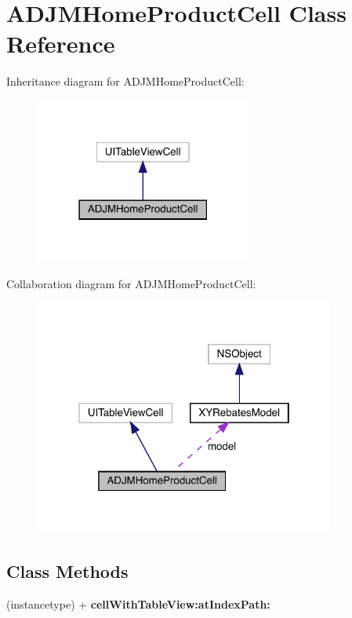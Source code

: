 \hypertarget{interface_a_d_j_m_home_product_cell}{}\section{A\+D\+J\+M\+Home\+Product\+Cell Class Reference}
\label{interface_a_d_j_m_home_product_cell}


Inheritance diagram for A\+D\+J\+M\+Home\+Product\+Cell\+:\nopagebreak
\begin{figure}[H]
\begin{center}
\leavevmode
\includegraphics[width=202pt]{interface_a_d_j_m_home_product_cell__inherit__graph}
\end{center}
\end{figure}


Collaboration diagram for A\+D\+J\+M\+Home\+Product\+Cell\+:\nopagebreak
\begin{figure}[H]
\begin{center}
\leavevmode
\includegraphics[width=280pt]{interface_a_d_j_m_home_product_cell__coll__graph}
\end{center}
\end{figure}
\subsection*{Class Methods}
\begin{DoxyCompactItemize}
\item 
\mbox{\label{interface_a_d_j_m_home_product_cell_a5de8b5b21ad71a7cb05f136cb9f5f6fc}} 
(instancetype) + {\bfseries cell\+With\+Table\+View\+:at\+Index\+Path\+:}
\end{DoxyCompactItemize}
